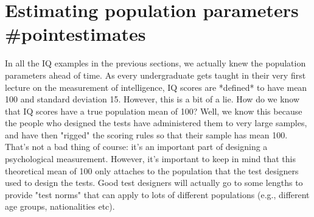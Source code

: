 \section{Estimating population parameters {#pointestimates}}

In all the IQ examples in the previous sections, we actually knew the population parameters ahead of time. As every undergraduate gets taught in their very first lecture on the measurement of intelligence, IQ scores are *defined* to have mean 100 and standard deviation 15. However, this is a bit of a lie. How do we know that IQ scores have a true population mean of 100? Well, we know this because the people who designed the tests have administered them to very large samples, and have then "rigged" the scoring rules so that their sample has mean 100. That's not a bad thing of course: it's an important part of designing a psychological measurement. However, it's important to keep in mind that this theoretical mean of 100 only attaches to the population that the test designers used to design the tests. Good test designers will actually go to some lengths to provide "test norms" that can apply to lots of different populations (e.g., different age groups, nationalities etc). 

